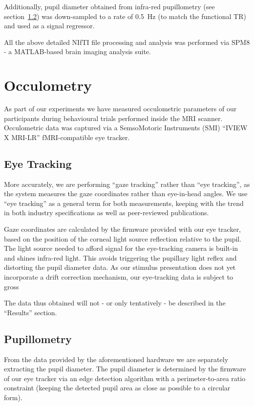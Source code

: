 	    Additionally, pupil diameter obtained from infra-red pupillometry (see section~\ref{sec:m_om_pm}) was down-sampled to a rate of \SI{0.5}{\hertz} (to match the functional TR) and used as a signal regressor.
	    
	    All the above detailed NIfTI file processing and analysis was performed via SPM8 - a MATLAB\textsuperscript{\small\textregistered}-based brain imaging analysis suite.
    \section{Occulometry}\label{sec:m_om}
	As part of our experiments we have measured occulometric parameters of our participants during behavioural trials performed inside the MRI scanner.
	Occulometric data was captured via a SemsoMotoric Instruments (SMI) “IVIEW X\textsuperscript{\small\texttrademark} MRI-LR” fMRI-compatible eye tracker.
	\subsection{Eye Tracking}\label{sec:m_om_et}
	    More accurately, we are performing “gaze tracking” rather than “eye tracking”, as the system measures the gaze coordinates rather than eye-in-head angles.
	    We use “eye tracking” as a general term for both measurements, keeping with the trend in both industry specifications\citep{Bojko2006} as well as peer-reviewed publications\citep{Kirk2013}.
	    
	    Gaze coordinates are calculated by the firmware provided with our eye tracker, based on the position of the corneal light source reflection relative to the pupil.
	    The light source needed to afford signal for the eye-tracking camera is built-in and shines infra-red light.
	    This avoids triggering the pupillary light reflex \citep{Ellis1981} and distorting the pupil diameter data.
	    As our stimulus presentation does not yet incorporate a drift correction mechanism, our eye-tracking data is subject to gross   
	    
	    The data thus obtained will not - or only tentatively - be described in the “Results” section.
	\subsection{Pupillometry}\label{sec:m_om_pm}
	    From the data provided by the aforementioned hardware we are separately extracting the pupil diameter.
	    The pupil diameter is determined by the firmware of our eye tracker via an edge detection algorithm with a perimeter-to-area ratio constraint
	    (keeping the detected pupil area as close as possible to a circular form).
	    
